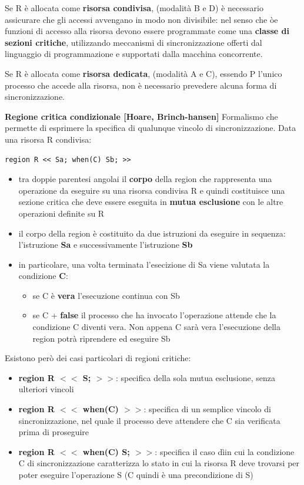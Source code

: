 \documentclass{article}
\begin{document}
\vspace{3mm}
Se R è allocata come \textbf{risorsa condivisa}, (modalità B e D) è necessario assicurare che gli accessi avvengano in modo non divisibile: nel senso che òe funzioni di accesso alla
risorsa devono essere programmate come una \textbf{classe di sezioni critiche}, utilizzando meccanismi di sincronizzazione offerti dal linguaggio di programmazione e supportati
dalla macchina concorrente.

\vspace{3mm}
Se R è allocata come \textbf{risorsa dedicata}, (modalità A e C), essendo P l'unico processo che accede alla risorsa, non è necessario prevedere alcuna forma di sincronizzazione.

\vspace{5mm}
{\large \textbf{Regione critica condizionale [Hoare, Brinch-hansen]}}
Formalismo che permette di esprimere la specifica di qualunque vincolo di sincronizzazione. Data una risorsa R condivisa:

\begin{lstlisting}
region R << Sa; when(C) Sb; >>
\end{lstlisting}

\begin{itemize}
    \item tra doppie parentesi angolai il \textbf{corpo} della region che rappresenta una operazione da eseguire su una risorsa condivisa R e quindi costituisce una sezione critica
    che deve essere eseguita in \textbf{mutua esclusione} con le altre operazioni definite su R
    \item il corpo della region è costituito da due istruzioni da eseguire in sequenza: l'istruzione \textbf{Sa} e successivamente l'istruzione \textbf{Sb}
    \item in particolare, una volta terminata l'esecizione di Sa viene valutata la condizione \textbf{C}:
    \begin{itemize}
        \item se C è \textbf{vera} l'esecuzione continua con Sb
        \item se C + \textbf{false} il processo che ha invocato l'operazione attende che la condizione C diventi vera. Non appena C sarà vera l'esecuzione della region potrà riprendere
        ed eseguire Sb
    \end{itemize}
\end{itemize}

Esistono però dei casi particolari di regioni critiche:
\begin{itemize}
    \item \textbf{region R $<<$ S; $>>$}: specifica della sola mutua esclusione, senza ulteriori vincoli
    \item \textbf{region R $<<$ when(C) $>>$}: specifica di un semplice vincolo di sincronizzazione, nel quale il processo deve attendere che C sia verificata prima di proseguire
    \item \textbf{region R $<<$ when(C) S; $>>$}: specifica il caso dìin cui la condizione C di sincronizzazione caratterizza lo stato in cui la risorsa R deve trovarsi per poter
    eseguire l'operazione S (C quindi è una precondizione di S)
\end{itemize}
\end{document}
